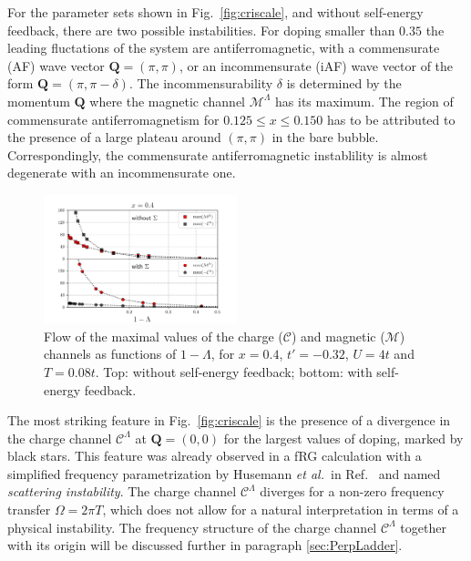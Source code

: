 For the parameter sets shown in Fig.~\ref{fig:criscale}, and without self-energy feedback, there are two possible instabilities. 
For doping smaller than $0.35$ the leading fluctations of the system are antiferromagnetic, with a commensurate (AF) wave vector $\mathbf{Q} = (\pi,\pi)$, or an incommensurate (iAF) wave vector of the form $\mathbf{Q}=(\pi,\pi-\delta)$.
The incommensurability $\delta$ is determined by the momentum $\mathbf{Q}$ where the magnetic channel $\mathcal{M}^\Lambda$ has its maximum. 
The region of commensurate antiferromagnetism for $0.125\le x \le 0.150$ has to be attributed to the presence of a large plateau around $(\pi,\pi)$ in the bare bubble. Correspondingly, the commensurate antiferromagnetic instablility is almost degenerate with an incommensurate one.
%
\begin{figure}
\includegraphics[width=0.50\textwidth]{images/chargeproblem_MC_vs_Lambda_fix_occ.png}
\caption{Flow of the maximal values of the charge ($\mathcal{C}$) and magnetic ($\mathcal{M}$) channels as functions of $1-\Lambda$, for  $x=0.4$, $t'=-0.32$, $U=4t$ and $T=0.08t$.  Top: without self-energy feedback; bottom: with self-energy feedback. }
\label{fig:chargeproblem}
\end{figure}
%

The most striking feature in Fig.~\ref{fig:criscale} is the presence of a divergence in the charge channel $\mathcal{C}^\Lambda$ at $\mathbf{Q}=(0,0)$ for the largest values of doping, marked by black stars. 
This feature was already observed in a fRG calculation with a simplified frequency parametrization by Husemann \textit{et al.}\ in Ref.~ and named \textit{scattering instability}. 
The charge channel $\mathcal{C}^\Lambda$ diverges for a non-zero frequency transfer $\Omega=2\pi T$, which does not allow for a natural interpretation in terms of a physical instability. 
The frequency structure of the charge channel $\mathcal{C}^\Lambda$ together with its origin will be discussed further in paragraph \ref{sec:PerpLadder}.

